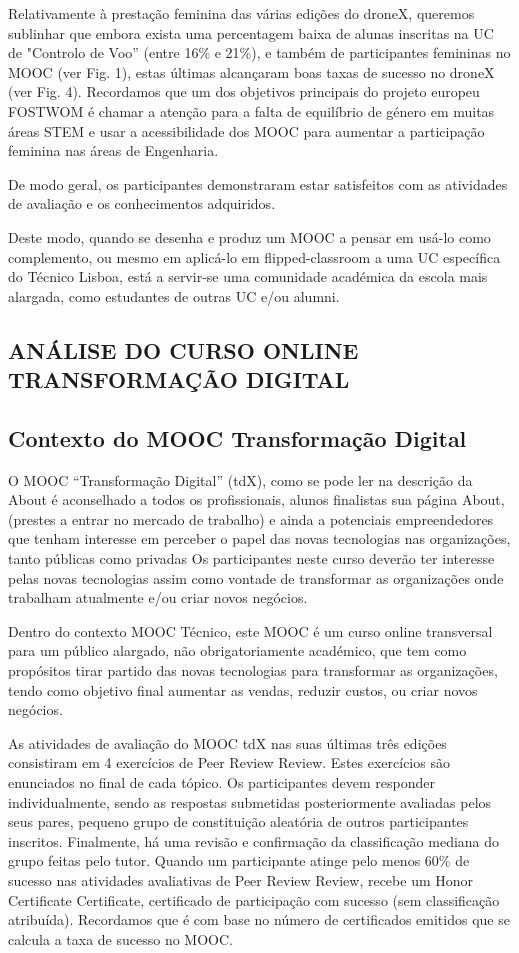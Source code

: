 Relativamente à prestação feminina das várias edições do droneX, queremos sublinhar que embora exista uma percentagem baixa de alunas inscritas na UC de "Controlo de Voo” (entre 16\% e 21\%), e também de participantes femininas no MOOC (ver Fig. 1), estas
últimas alcançaram boas taxas de sucesso no droneX (ver Fig. 4). Recordamos que um dos objetivos principais do projeto europeu FOSTWOM é chamar a atenção para a falta de equilíbrio de género em muitas áreas STEM e
usar a acessibilidade dos MOOC para aumentar a
participação feminina nas áreas de Engenharia.

De modo geral, os participantes demonstraram
estar satisfeitos com as atividades de avaliação e os conhecimentos adquiridos.

Deste modo, quando se desenha e produz um MOOC a pensar em usá-lo como complemento, ou mesmo em aplicá-lo em flipped-classroom a uma UC específica do Técnico Lisboa, está a servir-se uma comunidade académica da escola mais alargada, como estudantes de outras UC e/ou alumni.

\subsection{ANÁLISE DO CURSO ONLINE TRANSFORMAÇÃO DIGITAL}

\subsection{Contexto do MOOC Transformação Digital}

O MOOC “Transformação Digital” (tdX), como se pode ler na descrição da About é aconselhado a todos os profissionais, alunos finalistas
sua página About, (prestes a entrar no mercado de trabalho) e ainda a potenciais empreendedores que tenham interesse em perceber o papel das novas tecnologias nas
organizações, tanto públicas como privadas Os participantes neste curso deverão ter interesse pelas novas tecnologias assim como vontade de transformar as organizações onde trabalham atualmente e/ou criar novos negócios.

Dentro do contexto MOOC Técnico, este MOOC é um curso online transversal para um público alargado, não obrigatoriamente académico, que tem como propósitos tirar partido das novas tecnologias para transformar as organizações, tendo como objetivo final aumentar as vendas, reduzir custos, ou criar novos negócios.

As atividades de avaliação do MOOC tdX nas suas últimas três edições consistiram em 4 exercícios de Peer Review Review. Estes exercícios são enunciados no final de cada tópico. Os participantes devem responder individualmente, sendo as respostas submetidas posteriormente avaliadas pelos seus pares, pequeno grupo de constituição aleatória de outros participantes inscritos. Finalmente, há uma revisão e confirmação da classificação mediana do grupo feitas pelo tutor.
Quando um participante atinge pelo menos 60\% de sucesso nas atividades avaliativas de Peer Review Review, recebe um Honor Certificate
Certificate, certificado de participação com sucesso (sem classificação atribuída). Recordamos que é com base no número de certificados emitidos que se calcula a taxa de sucesso no MOOC.

